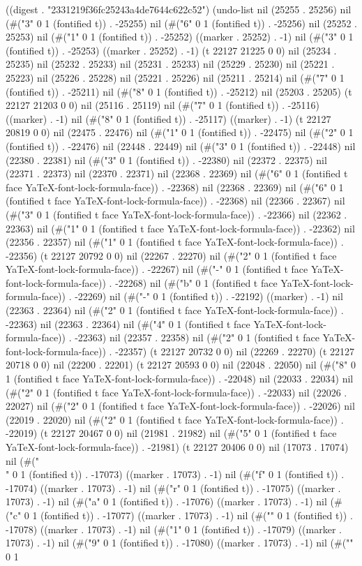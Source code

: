 
((digest . "2331219f36fc25243a4de7644c622c52") (undo-list nil (25255 . 25256) nil (#("3" 0 1 (fontified t)) . -25255) nil (#("6" 0 1 (fontified t)) . -25256) nil (25252 . 25253) nil (#("1" 0 1 (fontified t)) . -25252) ((marker . 25252) . -1) nil (#("3" 0 1 (fontified t)) . -25253) ((marker . 25252) . -1) (t 22127 21225 0 0) nil (25234 . 25235) nil (25232 . 25233) nil (25231 . 25233) nil (25229 . 25230) nil (25221 . 25223) nil (25226 . 25228) nil (25221 . 25226) nil (25211 . 25214) nil (#("7" 0 1 (fontified t)) . -25211) nil (#("8" 0 1 (fontified t)) . -25212) nil (25203 . 25205) (t 22127 21203 0 0) nil (25116 . 25119) nil (#("7" 0 1 (fontified t)) . -25116) ((marker) . -1) nil (#("8" 0 1 (fontified t)) . -25117) ((marker) . -1) (t 22127 20819 0 0) nil (22475 . 22476) nil (#("1" 0 1 (fontified t)) . -22475) nil (#("2" 0 1 (fontified t)) . -22476) nil (22448 . 22449) nil (#("3" 0 1 (fontified t)) . -22448) nil (22380 . 22381) nil (#("3" 0 1 (fontified t)) . -22380) nil (22372 . 22375) nil (22371 . 22373) nil (22370 . 22371) nil (22368 . 22369) nil (#("6" 0 1 (fontified t face YaTeX-font-lock-formula-face)) . -22368) nil (22368 . 22369) nil (#("6" 0 1 (fontified t face YaTeX-font-lock-formula-face)) . -22368) nil (22366 . 22367) nil (#("3" 0 1 (fontified t face YaTeX-font-lock-formula-face)) . -22366) nil (22362 . 22363) nil (#("1" 0 1 (fontified t face YaTeX-font-lock-formula-face)) . -22362) nil (22356 . 22357) nil (#("1" 0 1 (fontified t face YaTeX-font-lock-formula-face)) . -22356) (t 22127 20792 0 0) nil (22267 . 22270) nil (#("2" 0 1 (fontified t face YaTeX-font-lock-formula-face)) . -22267) nil (#("-" 0 1 (fontified t face YaTeX-font-lock-formula-face)) . -22268) nil (#("b" 0 1 (fontified t face YaTeX-font-lock-formula-face)) . -22269) nil (#("-" 0 1 (fontified t)) . -22192) ((marker) . -1) nil (22363 . 22364) nil (#("2" 0 1 (fontified t face YaTeX-font-lock-formula-face)) . -22363) nil (22363 . 22364) nil (#("4" 0 1 (fontified t face YaTeX-font-lock-formula-face)) . -22363) nil (22357 . 22358) nil (#("2" 0 1 (fontified t face YaTeX-font-lock-formula-face)) . -22357) (t 22127 20732 0 0) nil (22269 . 22270) (t 22127 20718 0 0) nil (22200 . 22201) (t 22127 20593 0 0) nil (22048 . 22050) nil (#("8" 0 1 (fontified t face YaTeX-font-lock-formula-face)) . -22048) nil (22033 . 22034) nil (#("2" 0 1 (fontified t face YaTeX-font-lock-formula-face)) . -22033) nil (22026 . 22027) nil (#("2" 0 1 (fontified t face YaTeX-font-lock-formula-face)) . -22026) nil (22019 . 22020) nil (#("2" 0 1 (fontified t face YaTeX-font-lock-formula-face)) . -22019) (t 22127 20467 0 0) nil (21981 . 21982) nil (#("5" 0 1 (fontified t face YaTeX-font-lock-formula-face)) . -21981) (t 22127 20406 0 0) nil (17073 . 17074) nil (#("\\" 0 1 (fontified t)) . -17073) ((marker . 17073) . -1) nil (#("f" 0 1 (fontified t)) . -17074) ((marker . 17073) . -1) nil (#("r" 0 1 (fontified t)) . -17075) ((marker . 17073) . -1) nil (#("a" 0 1 (fontified t)) . -17076) ((marker . 17073) . -1) nil (#("c" 0 1 (fontified t)) . -17077) ((marker . 17073) . -1) nil (#("{" 0 1 (fontified t)) . -17078) ((marker . 17073) . -1) nil (#("1" 0 1 (fontified t)) . -17079) ((marker . 17073) . -1) nil (#("9" 0 1 (fontified t)) . -17080) ((marker . 17073) . -1) nil (#("}" 0 1 